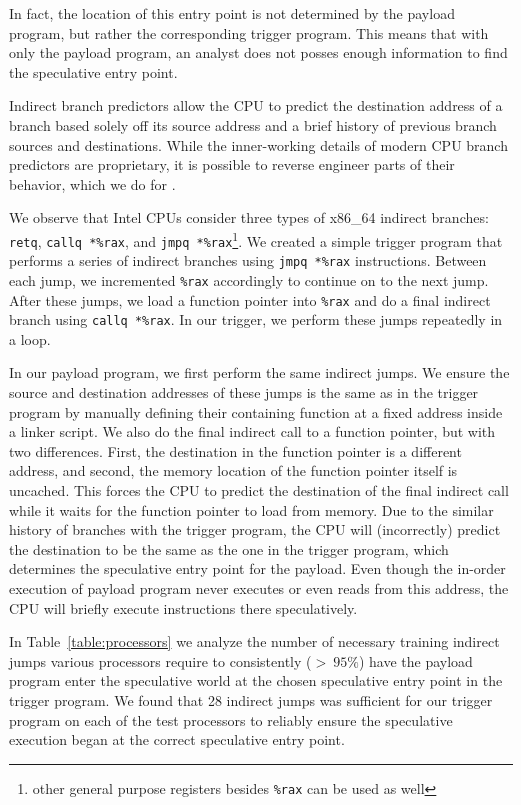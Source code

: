 In fact, the location of this entry point is not determined by the payload
program, but rather the corresponding trigger program. This means that with only
the payload program, an analyst does not posses enough information to find the
speculative entry point.

Indirect branch predictors allow the CPU to predict the destination address of a
branch based solely off its source address and a brief history of previous
branch sources and destinations. While the inner-working details of modern CPU
branch predictors are proprietary, it is possible to reverse engineer parts of
their behavior, which we do for \speculake.

We observe that Intel CPUs consider three types of x86\_64 indirect branches:
\texttt{retq}, \texttt{callq *\%rax}, and \texttt{jmpq *\%rax}\footnote{other
general purpose registers besides \texttt{\%rax} can be used as well}. We
created a simple trigger program that performs a series of indirect branches
using \texttt{jmpq *\%rax} instructions.
Between each
jump, we incremented \texttt{\%rax} accordingly to continue on to the next jump.
After these jumps, we load a function pointer into \texttt{\%rax} and do a
final indirect branch using \texttt{callq *\%rax}. In our trigger, we perform
these jumps repeatedly in a loop.


In our payload program, we first perform the same indirect jumps. We ensure
the source and destination addresses of these jumps is the same as in the
trigger program by manually defining their containing function at a fixed
address inside a linker script. We also do the final indirect call to a function
pointer, but with two differences. First, the destination in the function
pointer is a different address, and second, the memory location of the function
pointer itself is uncached. This forces the CPU to predict the destination of
the final indirect call while it waits for the function pointer to load from
memory. Due to the similar history of branches with the trigger program, the CPU
will (incorrectly) predict the destination to be the same as the one in the
trigger program, which determines the speculative entry point for the payload.
Even though the in-order execution of payload program never executes or even
reads from this address, the CPU will briefly execute instructions there
speculatively. 

\processorTable

In Table~\ref{table:processors} we analyze the number of necessary training
indirect jumps various processors require to consistently ($>~95\%$) have the
payload program enter the speculative world at the chosen speculative entry
point in the trigger program. We found that 28 indirect jumps was sufficient for
our trigger program on each of the test processors to reliably ensure the
speculative execution began at the correct speculative entry point.


